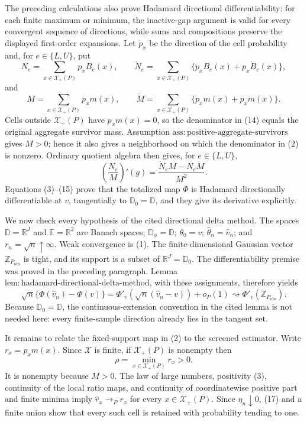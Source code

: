 The preceding calculations also prove Hadamard directional differentiability: for each finite maximum or minimum, the inactive-gap argument is valid for every convergent sequence of directions, while sums and compositions preserve the displayed first-order expansions.  Let \(\dot p_x\) be the direction of the cell probability and, for \(e\in\{L,U\}\), put
\[
N_e=\sum_{x\in\mathcal X_+(P)}p_xB_e(x),
\qquad
\dot N_e=\sum_{x\in\mathcal X_+(P)}\{\dot p_xB_e(x)+p_x\dot B_e(x)\},
\tag{13}
\]
and
\[
M=\sum_{x\in\mathcal X_+(P)}p_xm(x),
\qquad
\dot M=\sum_{x\in\mathcal X_+(P)}\{\dot p_xm(x)+p_x\dot m(x)\}.
\tag{14}
\]
Cells outside \(\mathcal X_+(P)\) have \(p_xm(x)=0\), so the denominator in (14) equals the original aggregate survivor mass.  Assumption \(\mathrm{ass{:}positive\text{-}aggregate\text{-}survivors}\) gives \(M>0\); hence it also gives a neighborhood on which the denominator in (2) is nonzero.  Ordinary quotient algebra then gives, for \(e\in\{L,U\}\),
\[
\left(\frac{N_e}{M}\right)'(g)=\frac{\dot N_eM-N_e\dot M}{M^2}.
\tag{15}
\]
Equations (3)--(15) prove that the totalized map \(\Phi\) is Hadamard directionally differentiable at \(v\), tangentially to \(\mathbb D_0=\mathbb D\), and they give its derivative explicitly.

We now check every hypothesis of the cited directional delta method.  The spaces \(\mathbb D=\mathbb R^J\) and \(\mathbb E=\mathbb R^2\) are Banach spaces; \(\mathbb D_\phi=\mathbb D\); \(\theta_0=v\); \(\widehat\theta_n=\widehat v_n\); and \(r_n=\sqrt n\uparrow\infty\).  Weak convergence is (1).  The finite-dimensional Gaussian vector \(\mathbb Z_{P_{\mathrm{obs}}}\) is tight, and its support is a subset of \(\mathbb R^J=\mathbb D_0\).  The differentiability premise was proved in the preceding paragraph.  Lemma \(\mathrm{lem{:}hadamard\text{-}directional\text{-}delta\text{-}method}\), with these assignments, therefore yields
\[
\sqrt n\{\Phi(\widehat v_n)-\Phi(v)\}
=\Phi'_v\!\left(\sqrt n(\widehat v_n-v)\right)+o_P(1)
\rightsquigarrow\Phi'_v(\mathbb Z_{P_{\mathrm{obs}}}).
\tag{16}
\]
Because \(\mathbb D_0=\mathbb D\), the continuous-extension convention in the cited lemma is not needed here: every finite-sample direction already lies in the tangent set.

It remains to relate the fixed-support map in (2) to the screened estimator.  Write \(r_x=p_xm(x)\).  Since \(\mathcal X\) is finite, if \(\mathcal X_+(P)\) is nonempty then
\[
\rho=\min_{x\in\mathcal X_+(P)}r_x>0.
\tag{17}
\]
It is nonempty because \(M>0\).  The law of large numbers, positivity (3), continuity of the local ratio maps, and continuity of coordinatewise positive part and finite minima imply \(\widehat r_x\to_Pr_x\) for every \(x\in\mathcal X_+(P)\).  Since \(\eta_n\downarrow0\), (17) and a finite union show that every such cell is retained with probability tending to one.

